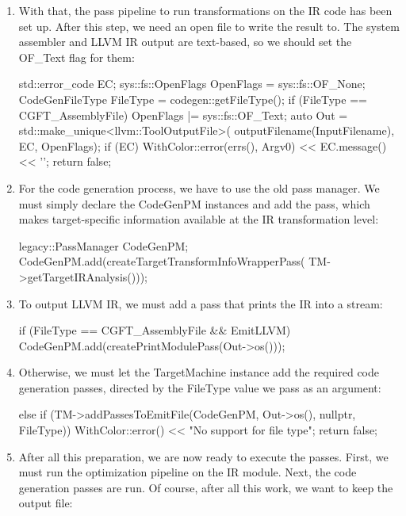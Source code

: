 \begin{enumerate}
\item
With that, the pass pipeline to run transformations on the IR code has been set up. After this step, we need an open file to write the result to. The system assembler and LLVM IR output are text-based, so we should set the OF\_Text flag for them:

\begin{cpp}
std::error_code EC;
sys::fs::OpenFlags OpenFlags = sys::fs::OF_None;
CodeGenFileType FileType = codegen::getFileType();
if (FileType == CGFT_AssemblyFile)
    OpenFlags |= sys::fs::OF_Text;
auto Out = std::make_unique<llvm::ToolOutputFile>(
    outputFilename(InputFilename), EC, OpenFlags);
if (EC) {
    WithColor::error(errs(), Argv0)
        << EC.message() << '\n';
    return false;
}
\end{cpp}

\item
For the code generation process, we have to use the old pass manager. We must simply declare the CodeGenPM instances and add the pass, which makes target-specific information available at the IR transformation level:

\begin{cpp}
legacy::PassManager CodeGenPM;
CodeGenPM.add(createTargetTransformInfoWrapperPass(
    TM->getTargetIRAnalysis()));
\end{cpp}

\item
To output LLVM IR, we must add a pass that prints the IR into a stream:

\begin{cpp}
if (FileType == CGFT_AssemblyFile && EmitLLVM) {
    CodeGenPM.add(createPrintModulePass(Out->os()));
}
\end{cpp}

\item
Otherwise, we must let the TargetMachine instance add the required code generation passes, directed by the FileType value we pass as an argument:

\begin{cpp}
else {
    if (TM->addPassesToEmitFile(CodeGenPM, Out->os(),
                                nullptr, FileType)) {
        WithColor::error()
        << "No support for file type\n";
        return false;
    }
}
\end{cpp}

\item
After all this preparation, we are now ready to execute the passes. First, we must run the optimization pipeline on the IR module. Next, the code generation passes are run. Of course, after all this work, we want to keep the output file:


\end{enumerate}

